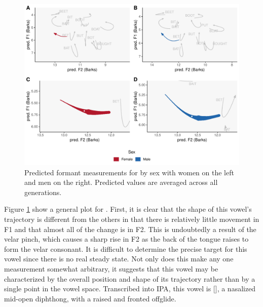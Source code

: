 \begin{figure}[tb!]
    \centering
    \includegraphics[width = 6.5in]{Figures/BANG/BANG_four_panel_plot_summarized.pdf}
    \caption[Predicted formant measurements for \bang by sex.]{Predicted formant measurements for \bang by sex with women on the left and men on the right. Predicted values are averaged across all generations.}
    \label{fig:BANG_four_panel_plot_summarized}
\end{figure}

Figure \ref{fig:BANG_four_panel_plot_summarized} show a general plot for \bang. First, it is clear that the shape of this vowel's trajectory is different from the others in that there is relatively little movement in F1 and that almost all of the change is in F2. This is undoubtedly a result of the velar pinch, which causes a sharp rise in F2 as the back of the tongue raises to form the velar consonant. It is difficult to determine the precise target for this vowel since there is no real steady state. Not only does this make any one measurement somewhat arbitrary, it suggests that this vowel may be characterized by the overall position and shape of its trajectory rather than by a single point in the vowel space. Transcribed into IPA, this vowel is []\vspace{-0.35em}, a nasalized mid-open diphthong, with a raised and fronted offglide.

